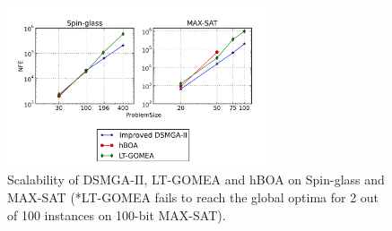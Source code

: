 \documentclass{sig-alternate-05-2015}
\begin{document}
\begin{figure}
\centering
\includegraphics[width=3in]{spin_satResults}
\caption{Scalability of DSMGA-II, LT-GOMEA and hBOA on Spin-glass and MAX-SAT (*LT-GOMEA fails to reach the global optima for 2 out of 100 instances on 100-bit  MAX-SAT).}
\end{figure}


%

%
%
\end{document}
